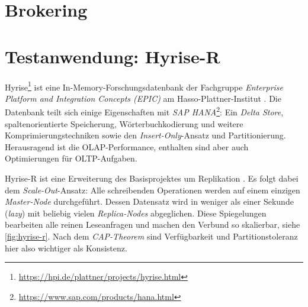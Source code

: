 \section{Brokering}



%
%
%
%
%
%
%


%
%
%
%
%

\section{Testanwendung: Hyrise-R}

Hyrise\footnote{\url{https://hpi.de/plattner/projects/hyrise.html}} ist eine In-Memory-Forschungsdatenbank der Fachgruppe \emph{Enterprise Platform and Integration Concepts (EPIC)} am Hasso-Plattner-Institut \cite{grund:2010:hyrise}. Die Datenbank teilt sich einige Eigenschaften mit \emph{SAP HANA}\footnote{\url{https://www.sap.com/products/hana.html}}: Ein \emph{Delta Store}, spaltenorientierte Speicherung, Wörterbuchkodierung und weitere Komprimierungstechniken sowie den \emph{Insert-Only}-Ansatz und Partitionierung. Herausragend ist die OLAP-Performance, enthalten sind aber auch Optimierungen für OLTP-Aufgaben.

Hyrise-R ist eine Erweiterung des Basisprojektes um Replikation \cite{schwalb:2015:hyrise-r}. Es folgt dabei dem \emph{Scale-Out}-Ansatz: Alle schreibenden Operationen werden auf einem einzigen \emph{Master-Node} durchgeführt. Dessen Datensatz wird in weniger als einer Sekunde (\emph{lazy}) mit beliebig vielen \emph{Replica-Nodes} abgeglichen. Diese Spiegelungen bearbeiten alle reinen Leseanfragen und machen den Verbund so skalierbar, siehe \autoref{fig:hyrise-r}. Nach dem \emph{CAP-Theorem} sind Verfügbarkeit und Partitionstoleranz hier also wichtiger als Konsistenz. 

